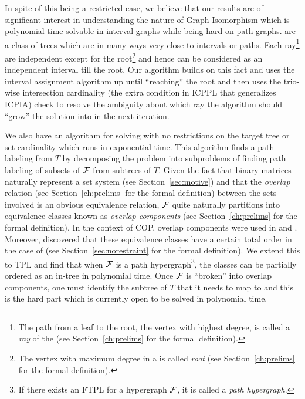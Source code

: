 In spite of this being a restricted case, we believe that our results
are of significant interest in understanding the nature of {\sc Graph
  Isomorphism} which is polynomial time solvable in interval graphs
while being hard on path graphs\cite{kklv10}. {\kstars} are a class of
trees which are in many ways very close to intervals or paths. Each
ray\footnote{The path from a leaf to the root, the vertex with highest
  degree, is called a {\em ray} of the \kstar (see
  Section~\ref{ch:prelims} for the formal definition).} are
independent except for the root\footnote{The vertex with maximum
  degree in a {\kstar} is called {\em root} (see
  Section~\ref{ch:prelims} for the formal definition).} and hence can
be considered as an independent interval till the root. Our algorithm
builds on this fact and uses the interval assignment
algorithm\cite{nsnrs09} up until ``reaching'' the root and then uses
the trio-wise intersection cardinality (the extra condition in ICPPL
that generalizes ICPIA) check to resolve the ambiguity about which ray
the algorithm should ``grow'' the solution into in the next iteration.

We also have an algorithm for solving {\CFTPL} with no restrictions on
the target tree or set cardinality which runs in exponential time.
This algorithm finds a path labeling from $T$ by decomposing the
problem into subproblems of finding path labeling of subsets of ${\cal F}$
from subtrees of $T$. Given the fact that binary matrices naturally
represent a set system (see Section~\ref{sec:motive}) and that the
{\em overlap} relation (see Section~\ref{ch:prelims} for the formal
definition) between the sets involved is an obvious equivalence
relation, ${\cal F}$ quite naturally partitions into equivalence classes
known as {\em overlap components} (see Section~\ref{ch:prelims} for
the formal definition). In the context of COP, overlap components were
used in \cite{wlh02} and \cite{kklv10}. Moreover, \cite{nsnrs09}
discovered that these equivalence classes have a certain total order
in the case of \COP (see Section~\ref{sec:norestraint} for the formal
definition).  We extend this to TPL and find that when ${\cal F}$ is a path
hypergraph\footnote{If there exists an FTPL for a hypergraph ${\cal F}$, it
  is called a {\em path hypergraph}.}, the classes can be partially ordered
as an in-tree in polynomial time. Once ${\cal F}$ is ``broken'' into
overlap components, one must identify the subtree of $T$ that it needs
to map to and this is the hard part which is currently open to be
solved in polynomial time.
